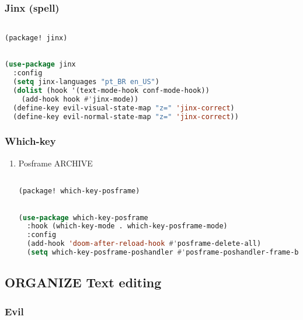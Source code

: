 \documentclass[11pt]{article}
\begin{document}
\subsubsection{Jinx (spell)}
\label{sec:jinx-spell}
\begin{lstlisting}[language=Lisp]%! Someone please complete this list for me

(package! jinx)
\end{lstlisting}

\begin{lstlisting}[language=Lisp]%! Someone please complete this list for me

(use-package jinx
  :config
  (setq jinx-languages "pt_BR en_US")
  (dolist (hook '(text-mode-hook conf-mode-hook))
    (add-hook hook #'jinx-mode))
  (define-key evil-visual-state-map "z=" 'jinx-correct)
  (define-key evil-normal-state-map "z=" 'jinx-correct))
\end{lstlisting}

\subsubsection{Which-key}
\label{sec:which-key}


\begin{enumerate}
  \item Posframe\hfill{} ARCHIVE
  \label{sec:posframe}

  \begin{lstlisting}[language=Lisp]%! Someone please complete this list for me

(package! which-key-posframe)
\end{lstlisting}

\begin{lstlisting}[language=Lisp]%! Someone please complete this list for me

(use-package which-key-posframe
  :hook (which-key-mode . which-key-posframe-mode)
  :config
  (add-hook 'doom-after-reload-hook #'posframe-delete-all)
  (setq which-key-posframe-poshandler #'posframe-poshandler-frame-bottom-center))
\end{lstlisting}
\end{enumerate}


\subsection{ORGANIZE Text editing}
\label{sec:organize-text-editing}


\subsubsection{Evil}
\label{sec:evil}
\end{document}
